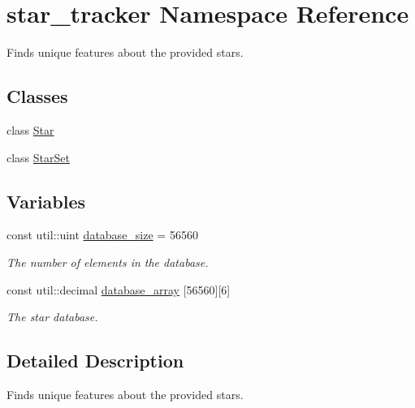 \hypertarget{namespacestar__tracker}{}\section{star\+\_\+tracker Namespace Reference}
\label{namespacestar__tracker}


Finds unique features about the provided stars.  


\subsection*{Classes}
\begin{DoxyCompactItemize}
\item 
class \hyperlink{classstar__tracker_1_1Star}{Star}
\item 
class \hyperlink{classstar__tracker_1_1StarSet}{Star\+Set}
\end{DoxyCompactItemize}
\subsection*{Variables}
\begin{DoxyCompactItemize}
\item 
\mbox{\label{namespacestar__tracker_aec9619ecae222c6615d448fa87324566}} 
const util\+::uint \hyperlink{namespacestar__tracker_aec9619ecae222c6615d448fa87324566}{database\+\_\+size} = 56560
\begin{DoxyCompactList}\small\item\em The number of elements in the database. \end{DoxyCompactList}\item 
\mbox{\label{namespacestar__tracker_a2bf2466772ad3c858e22928199cd3163}} 
const util\+::decimal \hyperlink{namespacestar__tracker_a2bf2466772ad3c858e22928199cd3163}{database\+\_\+array} \mbox{[}56560\mbox{]}\mbox{[}6\mbox{]}
\begin{DoxyCompactList}\small\item\em The star database. \end{DoxyCompactList}\end{DoxyCompactItemize}


\subsection{Detailed Description}
Finds unique features about the provided stars. 